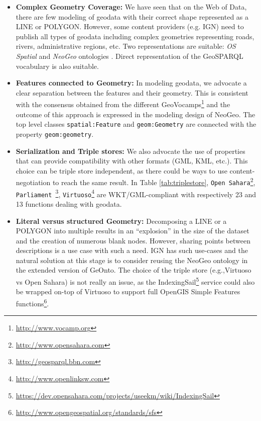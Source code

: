 \documentclass[a4paper,11pt]{report}
\begin{document}
\begin{itemize}
\item\textbf{Complex Geometry Coverage:} We have seen that on the Web of Data, there are few modeling of geodata with their correct shape represented as a LINE or POLYGON. However, some content providers (e.g. IGN) need to publish all types of geodata including complex geometries representing roads, rivers, administrative regions, etc. Two representations are suitable: \textit{OS Spatial} and \textit{NeoGeo} ontologies . Direct representation of the GeoSPARQL vocabulary is also suitable.
\item \textbf{Features connected to Geometry:} In modeling geodata, we advocate a clear separation between the features and their geometry. This is consistent with the consensus obtained from the different GeoVocamps\footnote{\url{http://www.vocamp.org}} and the outcome of this approach is expressed in the modeling design of NeoGeo. The top level classes \texttt{spatial:Feature} and \texttt{geom:Geometry} are connected with the property \texttt{geom:geometry}.
\item \textbf{Serialization and Triple stores:} We also advocate the use of properties that can provide compatibility with other formats (GML, KML, etc.). This choice can be triple store independent, as there could be ways to use content-negotiation to reach the same result. In Table \ref{tab:triplestore}, \texttt{Open Sahara}\footnote{\url{http://www.opensahara.com}}, \texttt{Parliament }\footnote{\url{http://geosparql.bbn.com}},  \texttt{Virtuoso}\footnote{\url{http://www.openlinksw.com}} are WKT/GML-compliant with respectively 23 and 13 functions dealing with geodata.
\item \textbf{Literal versus structured Geometry:} Decomposing a LINE or a POLYGON into multiple results in an ``explosion'' in the size of the dataset and the creation of numerous blank nodes. However, sharing points between descriptions is a use case with such a need. IGN has such use-cases and the natural solution at this stage is to consider reusing the NeoGeo ontology in the extended version of GeOnto. The choice of the triple store (e.g.,Virtuoso vs Open Sahara) is not really an issue, as the IndexingSail\footnote{\url{https://dev.opensahara.com/projects/useekm/wiki/IndexingSail}} service could also be wrapped on-top of Virtuoso to support full OpenGIS Simple Features functions\footnote{\url{http://www.opengeospatial.org/standards/sfs}}.
\end{itemize}
\end{document}

